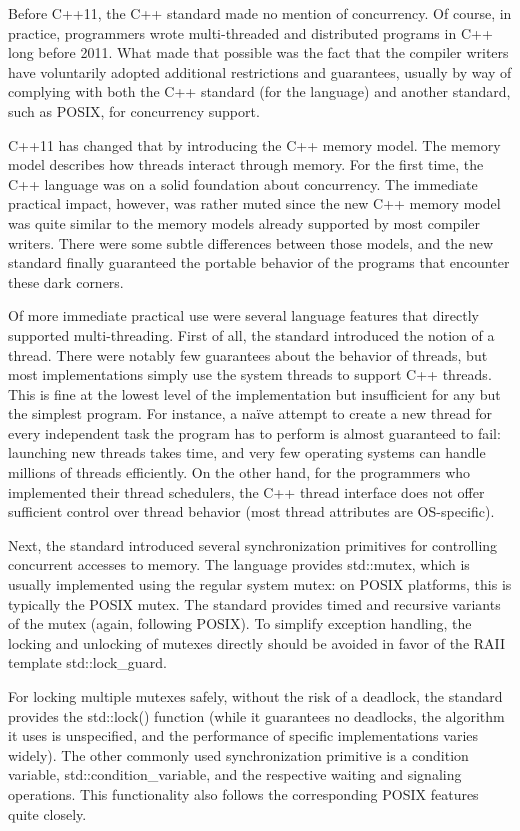 Before C++11, the C++ standard made no mention of concurrency. Of course, in practice, programmers wrote multi-threaded and distributed programs in C++ long before 2011. What made that possible was the fact that the compiler writers have voluntarily adopted additional restrictions and guarantees, usually by way of complying with both the C++ standard (for the language) and another standard, such as POSIX, for concurrency support. 

C++11 has changed that by introducing the C++ memory model. The memory model describes how threads interact through memory. For the first time, the C++ language was on a solid foundation about concurrency. The immediate practical impact, however, was rather muted since the new C++ memory model was quite similar to the memory models already supported by most compiler writers. There were some subtle differences between those models, and the new standard finally guaranteed the portable behavior of the programs that encounter these dark corners. 

Of more immediate practical use were several language features that directly supported multi-threading. First of all, the standard introduced the notion of a thread. There were notably few guarantees about the behavior of threads, but most implementations simply use the system threads to support C++ threads. This is fine at the lowest level of the implementation but insufficient for any but the simplest program. For instance, a naïve attempt to create a new thread for every independent task the program has to perform is almost guaranteed to fail: launching new threads takes time, and very few operating systems can handle millions of threads efficiently. On the other hand, for the programmers who implemented their thread schedulers, the C++ thread interface does not offer sufficient control over thread behavior (most thread attributes are OS-specific).

Next, the standard introduced several synchronization primitives for controlling concurrent accesses to memory. The language provides std::mutex, which is usually implemented using the regular system mutex: on POSIX platforms, this is typically the POSIX mutex. The standard provides timed and recursive variants of the mutex (again, following POSIX). To simplify exception handling, the locking and unlocking of mutexes directly should be avoided in favor of the RAII template std::lock\_guard. 

For locking multiple mutexes safely, without the risk of a deadlock, the standard provides the std::lock() function (while it guarantees no deadlocks, the algorithm it uses is unspecified, and the performance of specific implementations varies widely). The other commonly used synchronization primitive is a condition variable, std::condition\_variable, and the respective waiting and signaling operations. This functionality also follows the corresponding POSIX features quite closely.


